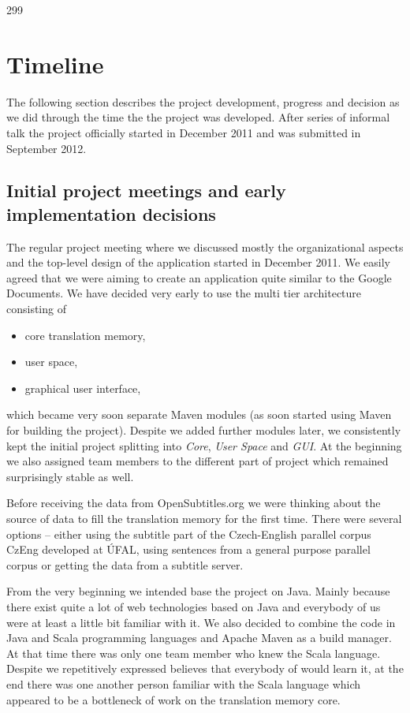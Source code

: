 299

\section{Timeline}

The following section describes the project development, progress and decision as we did through the time the the project was developed. After series of informal talk the project officially started in December 2011 and was submitted in September 2012.

\subsection{Initial project meetings and early implementation decisions}

The regular project meeting where we discussed mostly the organizational aspects and the top-level design of the application started in December 2011. We easily agreed that we were aiming to create an application quite similar to the Google Documents. We have decided very early to use the multi tier architecture consisting of

\begin{itemize}
\item core translation memory,
\item user space,
\item graphical user interface,
\end{itemize}

which became very soon separate Maven modules (as soon started using Maven for building the project). Despite we added further modules later, we consistently kept the initial project splitting into \emph{Core}, \emph{User Space} and \emph{GUI}. At the beginning we also assigned team members to the different part of project which remained surprisingly stable as well. 

Before receiving the data from OpenSubtitles.org we were thinking about the source of data to fill the translation memory for the first time. There were several options -- either using the subtitle part of the Czech-English parallel corpus CzEng developed at ÚFAL, using sentences from a general purpose parallel corpus or getting the data from a subtitle server.

From the very beginning we intended base the project on Java. Mainly because there exist quite a lot of web technologies based on Java and everybody of us were at least a little bit familiar with it. We also decided to combine the code in Java and Scala programming languages and Apache Maven as a build manager. At that time there was only one team member who knew the Scala language. Despite we repetitively expressed believes that everybody of would learn it, at the end there was one another person familiar with the Scala language which appeared to be a bottleneck of work on the translation memory core.

